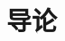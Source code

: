 \documentclass[../main.tex]{subfiles}
\begin{document}
\setcounter{chapter}{0}
\chapter{导论}\label{cha:introduction}
\end{document}
